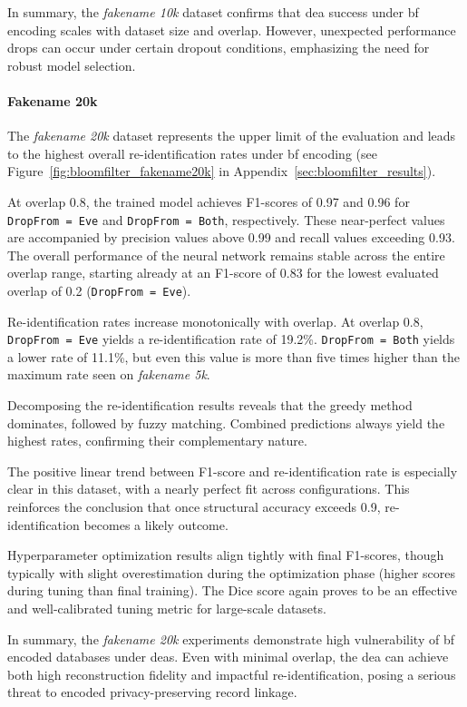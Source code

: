 In summary, the \textit{fakename 10k} dataset confirms that \ac{dea} success under \ac{bf} encoding scales with dataset size and overlap.
However, unexpected performance drops can occur under certain dropout conditions, emphasizing the need for robust model selection.

\paragraph{Fakename 20k}

The \textit{fakename 20k} dataset represents the upper limit of the evaluation and leads to the highest overall re-identification rates under \ac{bf} encoding (see Figure~\ref{fig:bloomfilter_fakename20k} in Appendix~\ref{sec:bloomfilter_results}).

At overlap 0.8, the trained model achieves F1-scores of 0.97 and 0.96 for \texttt{DropFrom = Eve} and \texttt{DropFrom = Both}, respectively.
These near-perfect values are accompanied by precision values above 0.99 and recall values exceeding 0.93.
The overall performance of the neural network remains stable across the entire overlap range, starting already at an F1-score of 0.83 for the lowest evaluated overlap of 0.2 (\texttt{DropFrom = Eve}).

Re-identification rates increase monotonically with overlap.
At overlap 0.8, \texttt{DropFrom = Eve} yields a re-identification rate of 19.2\%.
\texttt{DropFrom = Both} yields a lower rate of 11.1\%, but even this value is more than five times higher than the maximum rate seen on \textit{fakename 5k}.

Decomposing the re-identification results reveals that the greedy method dominates, followed by fuzzy matching.
Combined predictions always yield the highest rates, confirming their complementary nature.

The positive linear trend between F1-score and re-identification rate is especially clear in this dataset, with a nearly perfect fit across configurations.
This reinforces the conclusion that once structural accuracy exceeds 0.9, re-identification becomes a likely outcome.

Hyperparameter optimization results align tightly with final F1-scores, though typically with slight overestimation during the optimization phase (higher scores during tuning than final training).
The Dice score again proves to be an effective and well-calibrated tuning metric for large-scale datasets.

In summary, the \textit{fakename 20k} experiments demonstrate high vulnerability of \ac{bf} encoded databases under \ac{dea}s.
Even with minimal overlap, the \ac{dea} can achieve both high reconstruction fidelity and impactful re-identification, posing a serious threat to encoded privacy-preserving record linkage.

